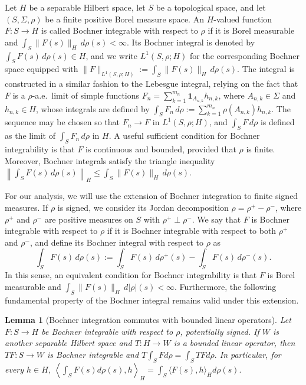 \documentclass[11pt]{amsart}
\newtheorem{lemma}[theorem]{Lemma}
\theoremstyle{definition}
\theoremstyle{remark}
\newcommand{\1}{\mathbf{1}}
\numberwithin{equation}{section}
\begin{document}
Let $H$ be a separable Hilbert space, let $S$ be a topological space, and let $(S,\Sigma,\rho)$ be a finite positive Borel measure space. An $H$-valued function $F:S\to H$ is called Bochner integrable with respect to $\rho$ if it is Borel measurable and $\int_S\|F(s)\|_H\,d\rho(s)<\infty$. Its Bochner integral is denoted by $\int_S F(s)\,d\rho(s)\in H$, and we write $L^1(S,\rho;H)$ for the corresponding Bochner space equipped with $\|F\|_{L^1(S,\rho;H)}:=\int_S\|F(s)\|_H\,d\rho(s)$. The integral is constructed in a similar fashion to the Lebesgue integral, relying on the fact that $F$ is a $\rho$-a.e.\ limit of simple functions $F_n=\sum_{k=1}^{m_n}\mathbf{1}_{A_{n,k}}h_{n,k}$, where $A_{n,k}\in\Sigma$ and $h_{n,k}\in H$, whose integrals are defined by $\int_S F_n\,d\rho:=\sum_{k=1}^{m_n}\rho(A_{n,k})h_{n,k}$. The sequence may be chosen so that $F_n\to F$ in $L^1(S,\rho;H)$, and $\int_S F\,d\rho$ is defined as the limit of $\int_S F_n\,d\rho$ in $H$. A useful sufficient condition for Bochner integrability is that $F$ is continuous and bounded, provided that $\rho$ is finite. Moreover, Bochner integrals satisfy the triangle inequality $\left\|\int_S F(s)\,d\rho(s)\right\|_H \leq \int_S\|F(s)\|_H\,d\rho(s).$

For our analysis, we will use the extension of Bochner integration to finite signed measures. If $\rho$ is signed, we consider its Jordan decomposition
$\rho = \rho^{+} - \rho^{-}$, where $\rho^{+}$ and $\rho^{-}$ are positive measures on $S$ with $\rho^{+}\perp \rho^{-}$. We say that $F$ is Bochner integrable with respect to $\rho$ if it is Bochner integrable with respect to both $\rho^{+}$ and $\rho^{-}$, and define its Bochner integral with respect to $\rho$ as
\[
\int_S F(s)\,d\rho(s)
    :=
    \int_S F(s)\,d\rho^+(s)
    -
    \int_S F(s)\,d\rho^-(s).
\]
In this sense, an equivalent condition for Bochner integrability is that  $F$ is Borel measurable and
$\int_S \|F(s)\|_H\,d|\rho|(s)<\infty$. Furthermore, the following fundamental property of the Bochner integral remains valid under this extension.
\begin{lemma}[Bochner integration commutes with bounded linear operators]
\label{lem:Bochner}
Let $F:S\to H$ be Bochner integrable with respect to $\rho$, potentially signed. If $W$ is another separable Hilbert space and $T:H\to W$ is a bounded linear operator, then $TF:S\to W$ is Bochner integrable and $T\int_S Fd\rho=\int_S TFd\rho.$
In particular, for every $h\in H$, $\left\langle \int_S F(s)d\rho(s),h\right\rangle_H=\int_S \langle F(s),h\rangle_H d\rho(s).$
\end{lemma}
\end{document}
